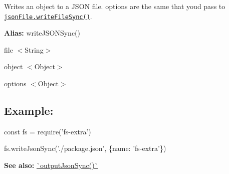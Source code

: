 Writes an object to a J\+S\+ON file. {\ttfamily options} are the same that you\textquotesingle{}d pass to \href{https://github.com/jprichardson/node-jsonfile#writefilesyncfilename-obj-options}{\tt {\ttfamily json\+File.\+write\+File\+Sync()}}.

{\bfseries Alias\+:} {\ttfamily write\+J\+S\+O\+N\+Sync()}


\begin{DoxyItemize}
\item {\ttfamily file} {\ttfamily $<$String$>$}
\item {\ttfamily object} {\ttfamily $<$Object$>$}
\item {\ttfamily options} {\ttfamily $<$Object$>$}
\end{DoxyItemize}

\subsection*{Example\+:}


\begin{DoxyCode}
const fs = require('fs-extra')

fs.writeJsonSync('./package.json', \{name: 'fs-extra'\})
\end{DoxyCode}




{\bfseries See also\+:} \mbox{\hyperlink{output_json-sync_8md}{\`{}output\+Json\+Sync()\`{}}} 